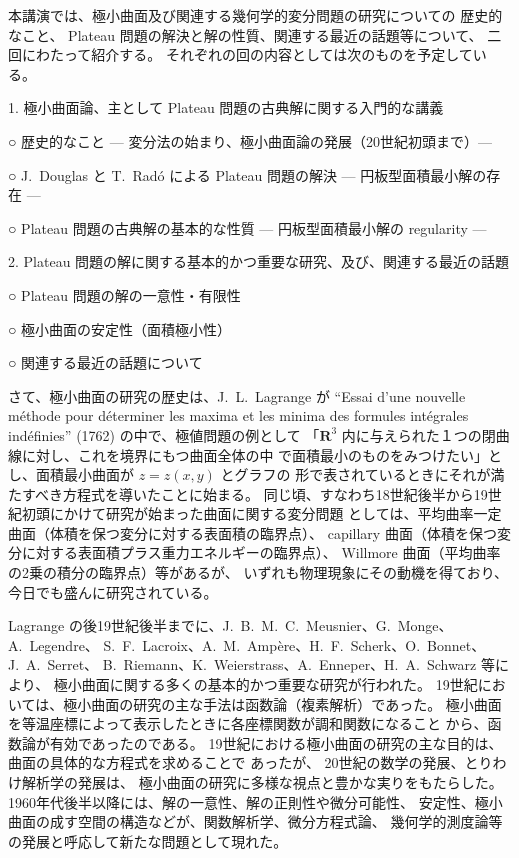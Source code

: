 \documentclass[uplatex,dvipdfmx]{jlreq}
\begin{document}
本講演では、極小曲面及び関連する幾何学的変分問題の研究についての
歴史的なこと、
Plateau 問題の解決と解の性質、関連する最近の話題等について、
二回にわたって紹介する。
それぞれの回の内容としては次のものを予定している。

\medskip

1. 極小曲面論、主として Plateau 問題の古典解に関する入門的な講義

\smallskip

\quad ○ 歴史的なこと
--- 変分法の始まり、極小曲面論の発展（20世紀初頭まで）---

\quad ○ J.~Douglas と T.~Radó による Plateau 問題の解決
--- 円板型面積最小解の存在 ---

\quad ○ Plateau 問題の古典解の基本的な性質
--- 円板型面積最小解の regularity ---

\medskip

2. Plateau 問題の解に関する基本的かつ重要な研究、及び、関連する最近の話題

\smallskip

\quad ○ Plateau 問題の解の一意性・有限性

\quad ○ 極小曲面の安定性（面積極小性）

\quad ○ 関連する最近の話題について

\bigskip

さて、極小曲面の研究の歴史は、J.~L.~Lagrange が ``Essai d'une nouvelle
méthode pour déterminer les maxima et les minima des formules
intégrales indéfinies'' (1762) の中で、極値問題の例として
「${\mathbf R}^3$ 内に与えられた１つの閉曲線に対し、これを境界にもつ曲面全体の中
で面積最小のものをみつけたい」とし、面積最小曲面が $z = z(x, y)$ とグラフの
形で表されているときにそれが満たすべき方程式を導いたことに始まる。
同じ頃、すなわち18世紀後半から19世紀初頭にかけて研究が始まった曲面に関する変分問題
としては、平均曲率一定曲面（体積を保つ変分に対する表面積の臨界点）、
capillary 曲面（体積を保つ変分に対する表面積プラス重力エネルギーの臨界点）、
Willmore 曲面（平均曲率の2乗の積分の臨界点）等があるが、
いずれも物理現象にその動機を得ており、今日でも盛んに研究されている。

Lagrange の後19世紀後半までに、J.~B.~M.~C.~Meusnier、G.~Monge、A.~Legendre、
S.~F.~Lacroix、A.~M.~Ampère、H.~F.~Scherk、O.~Bonnet、J.~A.~Serret、
B.~Riemann、K.~Weierstrass、A.~Enneper、H.~A.~Schwarz 等により、
極小曲面に関する多くの基本的かつ重要な研究が行われた。
19世紀においては、極小曲面の研究の主な手法は函数論（複素解析）であった。
極小曲面を等温座標によって表示したときに各座標関数が調和関数になること
から、函数論が有効であったのである。
19世紀における極小曲面の研究の主な目的は、曲面の具体的な方程式を求めることで
あったが、
20世紀の数学の発展、とりわけ解析学の発展は、
極小曲面の研究に多様な視点と豊かな実りをもたらした。
1960年代後半以降には、解の一意性、解の正則性や微分可能性、
安定性、極小曲面の成す空間の構造などが、関数解析学、微分方程式論、
幾何学的測度論等の発展と呼応して新たな問題として現れた。
\end{document}
